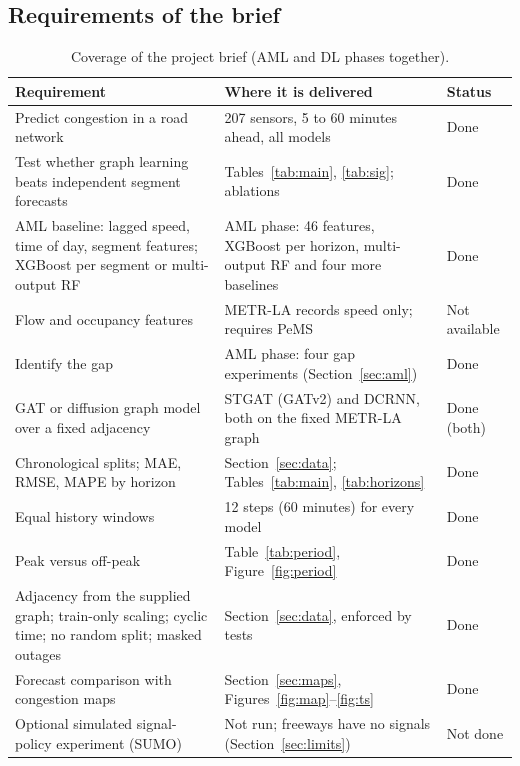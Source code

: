 \documentclass[11pt,a4paper]{article}
\begin{document}
\subsection{Requirements of the brief}
\begin{table}[H]
\centering
\caption{Coverage of the project brief (AML and DL phases together).}
\label{tab:brief}
\small
\begin{tabularx}{\linewidth}{@{}p{4.6cm}Xl@{}}
\toprule
Requirement & Where it is delivered & Status \\
\midrule
Predict congestion in a road network & 207 sensors, 5 to 60 minutes ahead, all models & \textcolor{good}{Done} \\
Test whether graph learning beats independent segment forecasts & Tables~\ref{tab:main}, \ref{tab:sig}; ablations & \textcolor{good}{Done} \\
AML baseline: lagged speed, time of day, segment features; XGBoost per segment or multi-output RF & AML phase: 46 features, XGBoost per horizon, multi-output RF and four more baselines & \textcolor{good}{Done} \\
Flow and occupancy features & METR-LA records speed only; requires PeMS & \textcolor{warn}{Not available} \\
Identify the gap & AML phase: four gap experiments (Section~\ref{sec:aml}) & \textcolor{good}{Done} \\
GAT or diffusion graph model over a fixed adjacency & STGAT (GATv2) and DCRNN, both on the fixed METR-LA graph & \textcolor{good}{Done (both)} \\
Chronological splits; MAE, RMSE, MAPE by horizon & Section~\ref{sec:data}; Tables~\ref{tab:main}, \ref{tab:horizons} & \textcolor{good}{Done} \\
Equal history windows & 12 steps (60 minutes) for every model & \textcolor{good}{Done} \\
Peak versus off-peak & Table~\ref{tab:period}, Figure~\ref{fig:period} & \textcolor{good}{Done} \\
Adjacency from the supplied graph; train-only scaling; cyclic time; no random split; masked outages & Section~\ref{sec:data}, enforced by \NTests{} tests & \textcolor{good}{Done} \\
Forecast comparison with congestion maps & Section~\ref{sec:maps}, Figures~\ref{fig:map}--\ref{fig:ts} & \textcolor{good}{Done} \\
Optional simulated signal-policy experiment (SUMO) & Not run; freeways have no signals (Section~\ref{sec:limits}) & \textcolor{warn}{Not done} \\
\bottomrule
\end{tabularx}
\end{table}
\end{document}

